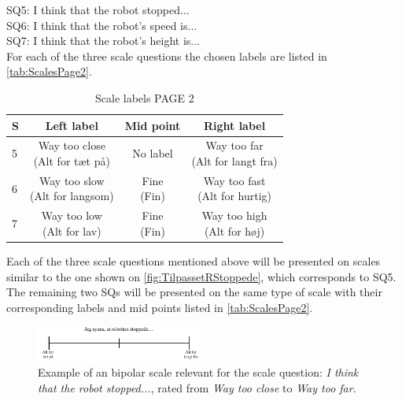 \noindent
% 
SQ5: I think that the robot stopped... \\%
SQ6: I think that the robot's speed is... \\%
SQ7: I think that the robot's height is... \\%
For each of the three scale questions the chosen labels are listed in \autoref{tab:ScalesPage2}.  
%
\begin{table}[H]
	\centering
\caption{Scale labels PAGE 2}
	\label{tab:ScalesPage2} 
	\begin{tabular}{l|c|c|c}
		S     & Left label & Mid point & Right label \\\hline
		5   & \makecell{Way too close\\(Alt for tæt på)}  & No label & \makecell{Way too far \\(Alt for langt fra)}        \\\hline
		6   & \makecell{Way too slow\\(Alt for langsom)} & \makecell{Fine\\(Fin)} & \makecell{Way too fast \\(Alt for hurtig)}         \\\hline
		7   & \makecell{Way too low \\(Alt for lav)} & \makecell{Fine\\(Fin)} & \makecell{Way too high\\(Alt for høj)}                
	\end{tabular}        
\end{table}
\noindent
%
Each of the three scale questions mentioned above will be presented on scales similar to the one shown on \autoref{fig:TilpassetRStoppede}, which corresponds to SQ5. The remaining two SQs will be presented on the same type of scale with their corresponding labels and mid points listed in \autoref{tab:ScalesPage2}.  
%
\begin{figure}[H]
\centering
\includegraphics[width = 0.49\textwidth]{Figure/TilpassetRStoppede}
\setlength{} 
\caption{Example of an bipolar scale relevant for the scale question: \textit{I think that the robot stopped...}, rated from \textit{Way too close} to \textit{Way too far}.}
\label{fig:TilpassetRStoppede}
\end{figure}
